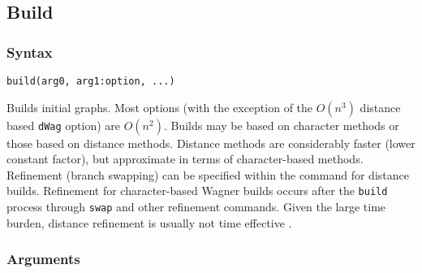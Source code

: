 \subsection{Build}
	\subsubsection{Syntax}
		\texttt{build(arg0, arg1:option, ...)}
	
	\begin{phygdescription}
		{Builds initial graphs. Most options (with the exception of the $O(n^3)$ distance based 
		\texttt{dWag} option) 	are $O(n^2)$. Builds may be based on character methods or those 
		based on distance methods. Distance methods are considerably faster (lower constant 
		factor), but approximate in terms of character-based methods. Refinement (branch swapping) 
		can be specified within the command for distance builds. Refinement for character-based 
		Wagner builds occurs after the \texttt{build} process through \texttt{swap} and other refinement 
		commands. Given the large time burden, distance refinement is usually not time effective 
		\citep{Wheeler2021}.}
	\end{phygdescription}
		
	\subsubsection{Arguments}


